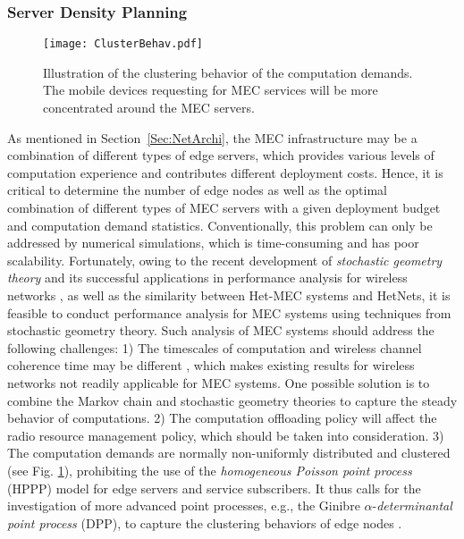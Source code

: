 \documentclass[journal]{IEEEtran}
\begin{document}
{\subsubsection{\textbf{Server Density Planning}}
\begin{figure}[!t]
\begin{center}
   \texttt{[image: ClusterBehav.pdf]}
\end{center}
\caption{Illustration of the clustering behavior of the computation demands. The mobile devices requesting for MEC services will be more concentrated around the MEC servers.}
\label{ClusterBehavior}
\end{figure}
As mentioned in Section~\ref{Sec:NetArchi}, the MEC infrastructure may be a combination of different types of edge servers, which provides various levels of computation experience and contributes different deployment costs. Hence, it is critical to determine the number of edge nodes as well as the optimal combination of different types of MEC servers with a given deployment budget and computation demand statistics. Conventionally, this problem can only be addressed by numerical simulations, which is time-consuming and has poor scalability. Fortunately, owing to the recent development of \emph{stochastic geometry theory} and its successful applications in performance analysis for wireless networks \cite{Haenggi0909,JGAndrews1111,Haenggi2012,CLiTCOM1604}, as well as the similarity between Het-MEC systems and HetNets, it is feasible to conduct performance analysis for MEC systems using techniques from stochastic geometry theory. Such analysis of MEC systems should address the following challenges: 1) The timescales of computation and wireless channel coherence time may be different \cite{WZhangTWC1312,JLiuISIT1607}, which makes existing results for wireless networks not readily applicable for MEC systems. One possible solution is to combine the Markov chain and stochastic geometry theories to capture the steady behavior of computations. 2) The computation offloading policy will affect the radio resource management policy, which should be taken into consideration. 3) The computation demands are normally non-uniformly distributed and clustered (see Fig. \ref{ClusterBehavior}), prohibiting the use of the \emph{homogeneous Poisson point process} (HPPP) model for edge servers and service subscribers. It thus calls for the investigation of more advanced point processes, e.g., the Ginibre $\alpha$-\emph{determinantal point process} (DPP), to capture the clustering behaviors of edge nodes \cite{VastardisDPP1402}.



}
\end{document}
